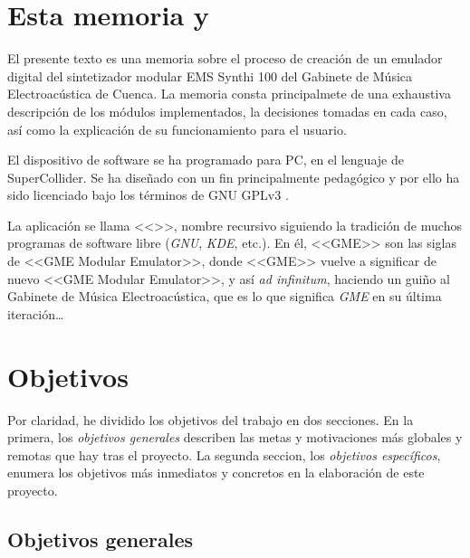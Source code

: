 \section{Esta memoria y \appName}

El presente texto es una memoria sobre el proceso de creación de un emulador digital del sintetizador modular EMS Synthi 100 del Gabinete de Música Electroacústica de Cuenca. La memoria consta principalmete de una exhaustiva descripción de los módulos implementados, la decisiones tomadas en cada caso, así como la explicación de su funcionamiento para el usuario.

El dispositivo de software se ha programado para PC, en el lenguaje de SuperCollider. Se ha diseñado con un fin principalmente pedagógico y por ello ha sido licenciado bajo los términos de GNU GPLv3 \citeyear{gpl}. 

La aplicación se llama <<\appName>>, nombre recursivo siguiendo la tradición de muchos programas de software libre (\textit{GNU}, \textit{KDE}, etc.). En él, <<GME>> son las siglas de <<GME Modular Emulator>>, donde <<GME>> vuelve a significar de nuevo <<GME Modular Emulator>>, y así \textit{ad infinitum}, haciendo un guiño al Gabinete de Música Electroacústica, que es lo que significa \textit{GME} en su última iteración\dots


\section{Objetivos}
\label{sec:objetivos}

Por claridad, he dividido los objetivos del trabajo en dos secciones. En la primera, los \textit{objetivos generales} describen las metas y motivaciones más globales y remotas que hay tras el proyecto. La segunda seccion, los \textit{objetivos específicos}, enumera los objetivos más inmediatos y concretos en la elaboración de este proyecto.


\subsection{Objetivos generales}


